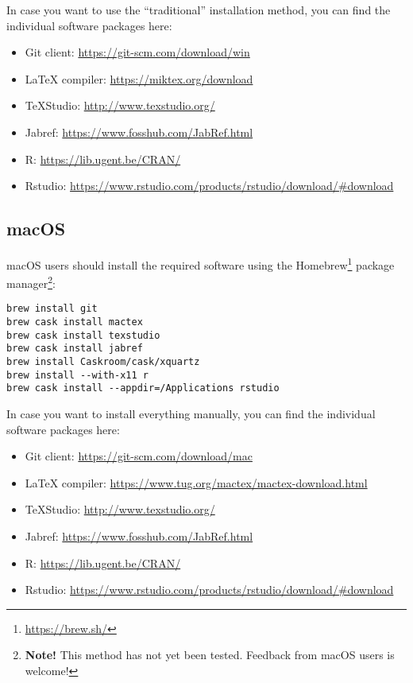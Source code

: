 In case you want to use the ``traditional'' installation method, you can find the individual software packages here:

\begin{itemize}
    \item Git client: \url{https://git-scm.com/download/win}
    \item \LaTeX{} compiler: \url{https://miktex.org/download}
    \item TeXStudio: \url{http://www.texstudio.org/}
    \item Jabref: \url{https://www.fosshub.com/JabRef.html}
    \item R: \url{https://lib.ugent.be/CRAN/}
    \item Rstudio: \url{https://www.rstudio.com/products/rstudio/download/#download}
\end{itemize}

\subsection{macOS}

macOS users should install the required software using the Homebrew\footnote{\url{https://brew.sh/}} package manager\footnote{\textbf{Note!} This method has not yet been tested. Feedback from macOS users is welcome!}:

\begin{verbatim}
brew install git
brew cask install mactex
brew cask install texstudio
brew cask install jabref
brew install Caskroom/cask/xquartz
brew install --with-x11 r
brew cask install --appdir=/Applications rstudio
\end{verbatim}

In case you want to install everything manually, you can find the individual software packages here:

\begin{itemize}
    \item Git client: \url{https://git-scm.com/download/mac}
    \item \LaTeX{} compiler: \url{https://www.tug.org/mactex/mactex-download.html}
    \item TeXStudio: \url{http://www.texstudio.org/}
    \item Jabref: \url{https://www.fosshub.com/JabRef.html}
    \item R: \url{https://lib.ugent.be/CRAN/}
    \item Rstudio: \url{https://www.rstudio.com/products/rstudio/download/#download}
\end{itemize}


